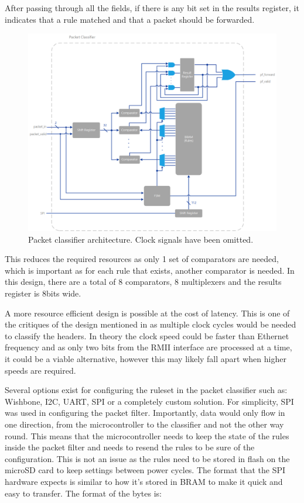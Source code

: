 After passing through all the fields, if there is any bit set in the results register, it indicates that a rule matched and that a packet should be forwarded. 


\begin{figure}[h!]
    \centering
    \includegraphics[width=1\textwidth]{Images/PacketFilterArchitecture.png}
    \caption[Packet classifier architecture]{Packet classifier architecture. Clock signals have been omitted.}
    \label{fig:packet_classifier_architecture}
\end{figure}

This reduces the required resources as only 1 set of comparators are needed, which is important as for each rule that exists, another comparator is needed. In this design, there are a total of 8 comparators, 8 multiplexers and the results register is 8bits wide. 

A more resource efficient design is possible at the cost of latency. This is one of the critiques of the design mentioned in \cite{FastRecongifFPGAFirewall} as multiple clock cycles would be needed to classify the headers. In theory the clock speed could be faster than Ethernet frequency and as only two bits from the RMII interface are processed at a time, it could be a viable alternative, however this may likely fall apart when higher speeds are required. 


Several options exist for configuring the ruleset in the packet classifier such as: Wishbone, I2C, UART, SPI or a completely custom solution. For simplicity, SPI was used in configuring the packet filter. Importantly, data would only flow in one direction, from the microcontroller to the classifier and not the other way round. This means that the microcontroller needs to keep the state of the rules inside the packet filter and needs to resend the rules to be sure of the configuration. This is not an issue as the rules need to be stored in flash on the microSD card to keep settings between power cycles. The format that the SPI hardware expects is similar to how it's stored in BRAM to make it quick and easy to transfer. The format of the bytes is: 


